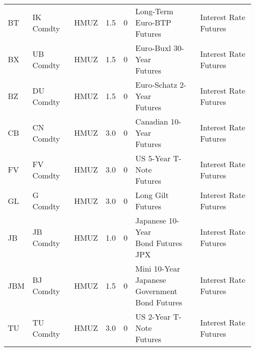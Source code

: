 \begin{longtable}{lllrrll}
                   BT &              IK Comdty &                      HMUZ &                               1.5 &                        0 &                     \makecell{Long-Term Euro-BTP\\Futures} &   Interest Rate Futures \\
                   BX &              UB Comdty &                      HMUZ &                               1.5 &                        0 &                      \makecell{Euro-Buxl 30-Year\\Futures} &   Interest Rate Futures \\
                   BZ &              DU Comdty &                      HMUZ &                               1.5 &                        0 &                     \makecell{Euro-Schatz 2-Year\\Futures} &   Interest Rate Futures \\
                   CB &              CN Comdty &                      HMUZ &                               3.0 &                        0 &                       \makecell{Canadian 10-Year\\Futures} &   Interest Rate Futures \\
                   FV &              FV Comdty &                      HMUZ &                               3.0 &                        0 &                       \makecell{US 5-Year T-Note\\Futures} &   Interest Rate Futures \\
                   GL &               G Comdty &                      HMUZ &                               3.0 &                        0 &                                          Long Gilt Futures &   Interest Rate Futures \\
                   JB &              JB Comdty &                      HMUZ &                               1.0 &                        0 &              \makecell{Japanese 10-Year\\Bond Futures JPX} &   Interest Rate Futures \\
                  JBM &              BJ Comdty &                      HMUZ &                               1.5 &                        0 & \makecell{Mini 10-Year\\Japanese Government\\Bond Futures} &   Interest Rate Futures \\
                   TU &              TU Comdty &                      HMUZ &                               3.0 &                        0 &                       \makecell{US 2-Year T-Note\\Futures} &   Interest Rate Futures \\

\end{longtable}
